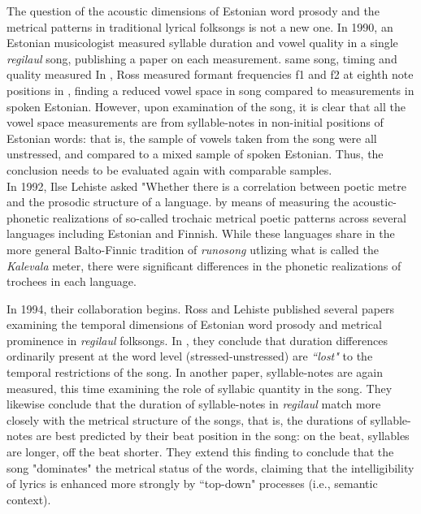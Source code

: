 The question of the acoustic dimensions of Estonian word prosody and the metrical patterns in traditional lyrical folksongs is not a new one. In 1990, an Estonian musicologist measured syllable duration and vowel quality in a single {\it regilaul} song, publishing a paper on each measurement. 
same song, timing and quality measured
In \citep{rossFormants90}, Ross measured formant frequencies f1 and f2 at eighth note positions in \citep{thesong}, finding a reduced vowel space in song compared to measurements in spoken Estonian. However, upon examination of the song, it is clear that all the vowel space measurements are from syllable-notes in non-initial positions of Estonian words: that is, the sample of vowels taken from  the song were all unstressed, and compared to a mixed sample of spoken Estonian. Thus, the conclusion needs to be evaluated again with comparable samples. 
\citep{rossStudyTimingEstonian1989a} \\
%
In 1992, Ilse Lehiste asked "Whether there is a correlation between poetic metre and the prosodic structure of a language.\citep{lehistePhoneticsMetrics1992} by means of measuring the acoustic-phonetic realizations of so-called trochaic metrical poetic patterns across several languages including Estonian and Finnish. While these languages share in the more general Balto-Finnic tradition of {\it runosong} utlizing what is called the {\it Kalevala} meter, there were significant differences in the phonetic realizations of trochees in each language. 


In 1994, their collaboration begins. Ross and Lehiste published several papers examining the temporal dimensions of Estonian word prosody and metrical prominence in {\it regilaul} folksongs. In \citep{rossLostProsodicOppositions1994}, they conclude that duration differences ordinarily present at the word level (stressed-unstressed) are {\it ``lost"} to the temporal restrictions of the song. In another paper, syllable-notes are again measured, this time examining the role of syllabic quantity in the song. They likewise conclude that the duration of syllable-notes in {\it regilaul} match more closely with the metrical structure of the songs, that is, the durations of syllable-notes are best predicted by their beat position in the song: on the beat, syllables are longer, off the beat shorter. They extend this finding to conclude that the song "dominates" the metrical status of the words, claiming that the intelligibility of lyrics is enhanced more strongly by ``top-down" processes (i.e., semantic context). 

